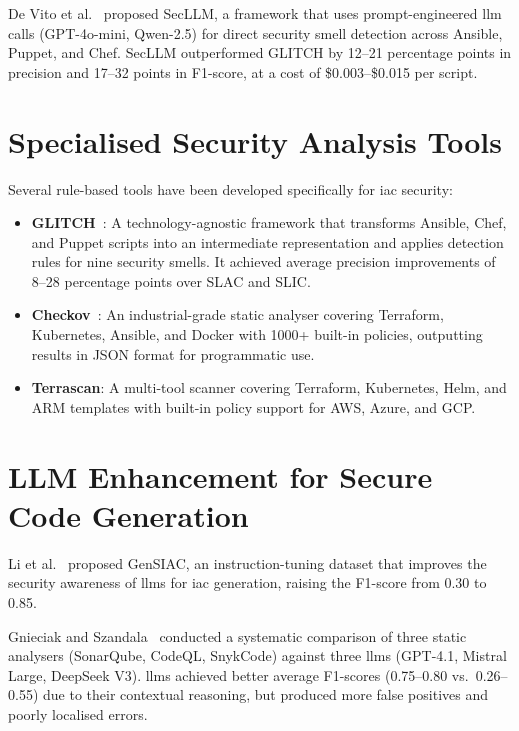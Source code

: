 \documentclass[12pt, a4paper]{report}
\begin{document}
De Vito et al.~\citep{devito2025secllm} proposed SecLLM, a framework that uses
prompt-engineered \gls{llm} calls (GPT-4o-mini, Qwen-2.5) for direct security smell
detection across Ansible, Puppet, and Chef. SecLLM outperformed GLITCH by
12--21 percentage points in precision and 17--32 points in F1-score, at a cost of
\$0.003--\$0.015 per script.

\section{Specialised Security Analysis Tools}

Several rule-based tools have been developed specifically for \gls{iac} security:

\begin{itemize}
  \item \textbf{GLITCH}~\citep{saavedra2022glitch}: A technology-agnostic framework
  that transforms Ansible, Chef, and Puppet scripts into an intermediate representation
  and applies detection rules for nine security smells. It achieved average precision
  improvements of 8--28 percentage points over SLAC and SLIC.

  \item \textbf{Checkov}~\citep{checkov2024}: An industrial-grade static analyser
  covering Terraform, Kubernetes, Ansible, and Docker with 1000+ built-in policies,
  outputting results in JSON format for programmatic use.

  \item \textbf{Terrascan}: A multi-tool scanner covering Terraform, Kubernetes,
  Helm, and ARM templates with built-in policy support for AWS, Azure, and GCP.
\end{itemize}

\section{LLM Enhancement for Secure Code Generation}

Li et al.~\citep{li2025gensiac} proposed GenSIAC, an instruction-tuning dataset
that improves the security awareness of \gls{llm}s for \gls{iac} generation,
raising the F1-score from 0.30 to 0.85.

Gnieciak and Szandala~\citep{gnieciak2025llmvsstatic} conducted a systematic
comparison of three static analysers (SonarQube, CodeQL, SnykCode) against three
\gls{llm}s (GPT-4.1, Mistral Large, DeepSeek V3). \gls{llm}s achieved better average
F1-scores (0.75--0.80 vs.\ 0.26--0.55) due to their contextual reasoning, but produced
more false positives and poorly localised errors.
\end{document}
